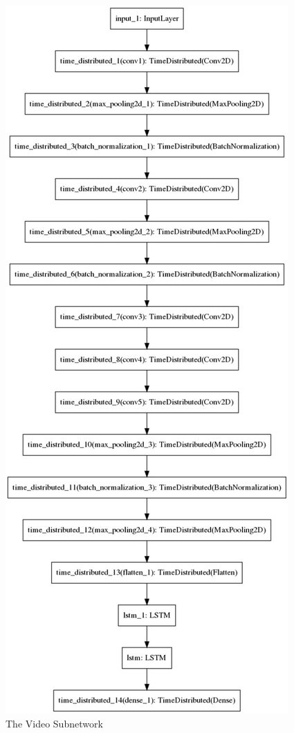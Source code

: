 \documentclass{article}
\begin{document}
\begin{figure}
\centering
\includegraphics[scale=0.52]{VideoModelPlot.png}
\caption{\label{fig:Video SubNetwork Architecture}The Video Subnetwork}
\end{figure}
\end{document}
